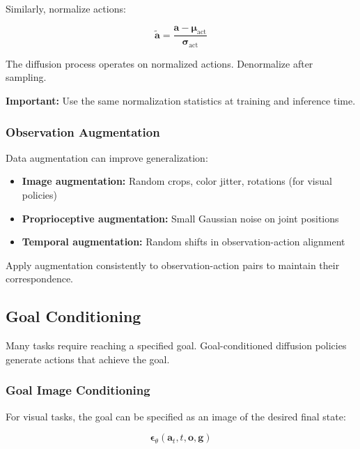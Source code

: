 Similarly, normalize actions:

\begin{equation}
\tilde{\mathbf{a}} = \frac{\mathbf{a} - \boldsymbol{\mu}_{\text{act}}}{\boldsymbol{\sigma}_{\text{act}}}
\label{eq:act_normalization}
\end{equation}

The diffusion process operates on normalized actions. Denormalize after sampling.

\textbf{Important:} Use the same normalization statistics at training and inference time.

\subsubsection{Observation Augmentation}

Data augmentation can improve generalization:

\begin{itemize}
    \item \textbf{Image augmentation:} Random crops, color jitter, rotations (for visual policies)
    \item \textbf{Proprioceptive augmentation:} Small Gaussian noise on joint positions
    \item \textbf{Temporal augmentation:} Random shifts in observation-action alignment
\end{itemize}

Apply augmentation consistently to observation-action pairs to maintain their correspondence.

\subsection{Goal Conditioning}
\label{subsec:goal_conditioning}

Many tasks require reaching a specified goal. Goal-conditioned diffusion policies generate actions that achieve the goal.

\subsubsection{Goal Image Conditioning}

For visual tasks, the goal can be specified as an image of the desired final state:

\begin{equation}
\boldsymbol{\epsilon}_\theta(\mathbf{a}_t, t, \mathbf{o}, \mathbf{g})
\label{eq:goal_image_conditioning}
\end{equation}

